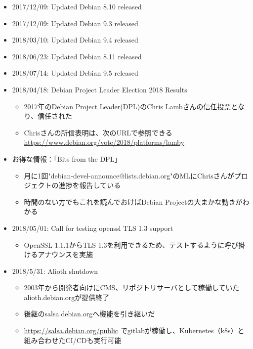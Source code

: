 \documentclass[mingoth,a4paper]{jsarticle}
\begin{document}
\begin{itemize}
  \item 2017/12/09:  Updated Debian 8.10 released
  \item 2017/12/09:  Updated Debian 9.3  released
  \item 2018/03/10:  Updated Debian 9.4  released
  \item 2018/06/23:  Updated Debian 8.11 released
  \item 2018/07/14:  Updated Debian 9.5  released
\end{itemize}

\begin{itemize}
\item 2018/04/18: Debian Project Leader Election 2018 Results
  \begin{itemize}
  \item 2017年のDebian Project Leader(DPL)のChris Lambさんの信任投票となり、信任された
  \item Chrisさんの所信表明は、次のURLで参照できる\\
    \url{https://www.debian.org/vote/2018/platforms/lamby}
  \end{itemize}
\item お得な情報：「Bits from the DPL」
  \begin{itemize}
  \item 月に1回"debian-devel-announce@lists.debian.org"のMLにChrisさんがプロジェクトの進捗を報告している
  \item 時間のない方でもこれを読んでおけばDebian Projectの大まかな動きがわかる
  \end{itemize}
\end{itemize}

\begin{itemize}
\item 2018/05/01: Call for testing openssl TLS 1.3 support
  \begin{itemize}
  \item OpenSSL 1.1.1からTLS 1.3を利用できるため、テストするように呼び掛けるアナウンスを実施
  \end{itemize}
\end{itemize}

\begin{itemize}
\item 2018/5/31:  Alioth shutdown
  \begin{itemize}
  \item 2003年から開発者向けにCMS、リポジトリサーバとして稼働していたalioth.debian.orgが提供終了
  \item 後継のsalsa.debian.orgへ機能を引き継いだ
  \item \url{https://salsa.debian.org/public} でgitlabが稼働し、Kubernetes（k8s）と組み合わせたCI/CDも実行可能
  \end{itemize}
\end{itemize}
\end{document}
